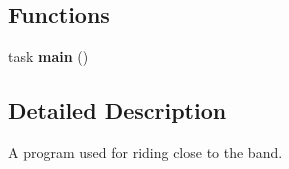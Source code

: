 \subsection*{Functions}
\begin{DoxyCompactItemize}
\item 
\hypertarget{fence_8nxc_a9a2af8e2cd81255d3bf384db4a382807}{
task {\bfseries main} ()}
\label{fence_8nxc_a9a2af8e2cd81255d3bf384db4a382807}

\end{DoxyCompactItemize}


\subsection{Detailed Description}
A program used for riding close to the band. 